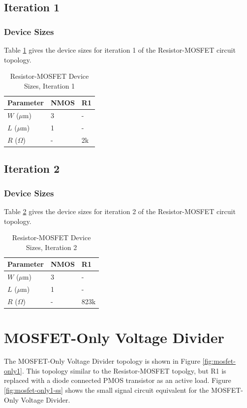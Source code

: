 \documentclass[conference]{IEEEtran}
\begin{document}
\subsection{Iteration 1}
\subsubsection{Device Sizes}
Table \ref{tab:rm-ds-1} gives the device sizes for iteration 1 of the Resistor-MOSFET circuit topology.
\begin{table}[!htbp]
  \caption[]{Resistor-MOSFET Device Sizes, Iteration 1}
  \label{tab:rm-ds-1}
  \centering
  \begin{tabular}{|l|l|l|}
    \hline
    Parameter			& NMOS	&R1 \\ \hline
    $W$ ($\mu$m)		&3		&-\\ 
    $L$ ($\mu$m)		& 1		&-\\
    $R$ ($\Omega$)		&-		&2k\\
    \hline
  \end{tabular}
\end{table}

\subsection{Iteration 2}
\subsubsection{Device Sizes}
Table \ref{tab:rm-ds-2} gives the device sizes for iteration 2 of the Resistor-MOSFET circuit topology. 
\begin{table}[!htbp]
  \caption[]{Resistor-MOSFET Device Sizes, Iteration 2}
  \label{tab:rm-ds-2}
  \centering
  \begin{tabular}{|l|l|l|}
    \hline
    Parameter			& NMOS	&R1 \\ \hline
    $W$ ($\mu$m)		&3		&-\\ 
    $L$ ($\mu$m)		& 1		&-\\
    $R$ ($\Omega$)		&-		&823k\\
    \hline
  \end{tabular}
\end{table}
\pagebreak
\section{MOSFET-Only Voltage Divider}
The MOSFET-Only Voltage Divider topology is shown in Figure \ref{fig:mosfet-only1}.  This topology similar to the Resistor-MOSFET topolgy, but R1 is replaced with a diode connected PMOS transistor as an active load.  Figure \ref{fig:mosfet-only1-ss} shows the small signal circuit equivalent for the MOSFET-Only Voltage Divider.
\end{document}
